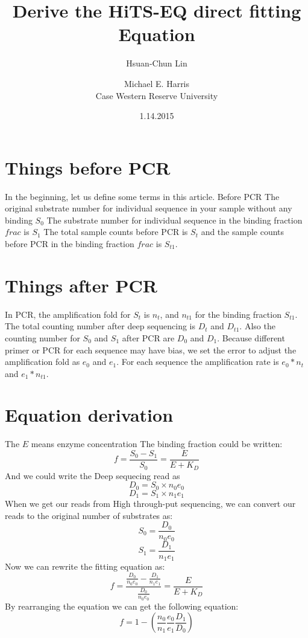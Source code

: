 \documentclass[a4paper, 10pt]{article}
\begin{document}
\title{Derive the HiTS-EQ direct fitting Equation}
\date{1.14.2015}
\author{Hsuan-Chun Lin \and Michael E. Harris \\
Case Western Reserve University}

\maketitle

\section{Things before PCR}

In the beginning, let us define some terms in this article.
Before PCR
The original substrate number for individual sequence in your sample without any binding $S_0$
The substrate number for individual sequence in the binding fraction $frac$ is $S_1$
The total sample counts before PCR is $S_t$ and the sample counts before PCR in the binding fraction $frac$ is $S_{t1}$.

\section{Things after PCR}
In PCR, the amplification fold for $S_t$ is $n_t$, and $n_{t1}$ for the binding fraction $S_{t1}$. The total counting number after deep sequencing is $D_{t}$ and $D_{t1}$.
Also the counting number for $S_0$ and $S_1$ after PCR are $D_0$ and $D_1$. Because different primer or PCR for each sequence may have bias, we set the error to adjust the amplification fold as $e_0$ and $e_1$.
For each sequence the amplification rate is $e_0*n_t$ and $e_1*n_{t1}$.

\section{Equation derivation}
The $E$ means enzyme concentration
The binding fraction could be written:
\[
f =\frac{S_0-S_1}{S_0}= \frac{E}{E+K_D}
\]
And we could write the Deep sequecing read as 
\[D_0 = S_0\times n_0e_0\]
\[D_1 = S_1\times n_1e_1\]
When we get our reads from High through-put sequencing, we can convert our reads to the original number of substrates as:
\[ S_0 = \frac{D_0}{n_0e_0} \] 
\[ S_1 = \frac{D_1}{n_1e_1} \]
Now we can rewrite the fitting equation as:
\[
f = \frac{ \frac{D_0}{n_0e_0} - \frac{D_1}{n_1e_1} }{\frac{D_0}{n_0e_0}} = \frac{E}{E+K_D}
\]
By rearranging the equation we can get the following equation:
\[
f = 1-(\frac{n_0}{n_1}\frac{e_0}{e_1}\frac{D_1}{D_0})
\]
\end{document}
